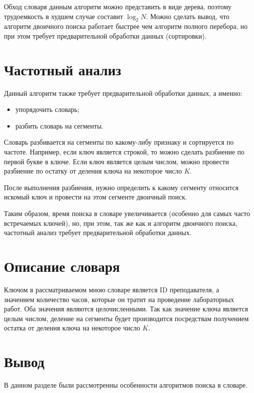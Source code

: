 \documentclass[12pt]{report}
\begin{document}
Обход словаря данным алгоритм можно представить в виде дерева, поэтому трудоемкость в худшем случае составит $\log_{2}{N}$. Можно сделать вывод, что алгоритм двоичного поиска работает быстрее чем алгоритм полного перебора, но при этом требует предварительной обработки данных (сортировки).
	
\section{Частотный анализ}
	
Данный алгоритм также требует предварительной обработки данных, а именно:
	
\begin{itemize}
	\item упорядочить словарь;
	\item разбить словарь на сегменты.
\end{itemize}
	
Словарь разбивается на сегменты по какому-либу признаку и сортируется по частоте. Например, если ключ является строкой, то можно сделать разбиение по первой букве в ключе. Если ключ является целым числом, можно провести разбиение по остатку от деления ключа на некоторое число $K$.
	
После выполнения разбиения, нужно определить к какому сегменту относится искомый ключ и провести на этом сегменте двоичный поиск.
	
Таким образом, время поиска в словаре увеличивается (особенно для самых часто встречаемых ключей), но, при этом, так же как и алгоритм двоичного поиска, частотный анализ требует предварительной обработки данных. 
	
\section{Описание словаря}
	
Ключом в рассматриваемом мною словаре является ID преподавателя, а значением количество часов, которые он тратит на проведение лабораторных работ. Оба значения являются целочисленными. Так как значение ключа является целым числом, деление на сегменты будет производится посредствам получением остатка от деления ключа на некоторое число $K$.
	
\section*{Вывод}
В данном разделе были рассмотренны особенности алгоритмов поиска в словаре.
	
\end{document}
